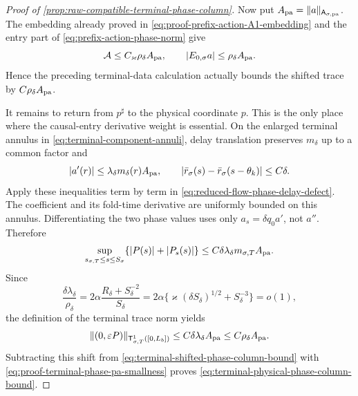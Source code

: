 \begin{proof}[Proof of
\cref{prop:raw-compatible-terminal-phase-column}]
Now put
\(A_{\rm pa}=\|a\|_{\mathsf A_{\sigma,\mathrm{pa}}}\).
The embedding already proved in
\cref{eq:proof-prefix-action-A1-embedding} and the entry part of
\cref{eq:prefix-action-phase-norm} give
\begin{equation}
 \mathcal A\le C_\varkappa\rho_\delta A_{\rm pa},
 \qquad |E_{0,\sigma}a|\le\rho_\delta A_{\rm pa}.  \label{eq:proof-terminal-phase-pa-smallness}
\end{equation}
Hence the preceding terminal-data calculation actually bounds the shifted
trace by \(C\rho_\delta A_{\rm pa}\).

It remains to return from \(p^\sharp\) to the physical coordinate \(p\).
This is the only place where the causal-entry derivative weight is
essential.  On the enlarged terminal annulus in
\cref{eq:terminal-component-annuli}, delay translation preserves
\(m_\delta\) up to a common factor and
\begin{equation}
 |a'(r)|\le\lambda_\delta m_\delta(r)A_{\rm pa},\qquad
 |\bar r_\sigma(s)-\bar r_\sigma(s-\theta_k)|\le C\delta.  \label{eq:proof-terminal-phase-local-difference-input}
\end{equation}
Apply these inequalities term by term in
\cref{eq:reduced-flow-phase-delay-defect}.  The coefficient and its
fold-time derivative are uniformly bounded on this annulus.  Differentiating
the two phase values uses only
\(a_s=\delta q_0a'\), not \(a''\).  Therefore
\begin{equation}
 \sup_{s_{\sigma,T}\le s\le S_\sigma}
   \{|P(s)|+|P_s(s)|\}
 \le C\delta\lambda_\delta m_{\sigma,T}A_{\rm pa}.  \label{eq:proof-terminal-phase-local-difference}
\end{equation}
Since
\begin{equation}
 \frac{\delta\lambda_\delta}{\rho_\delta}
 =2\alpha\frac{R_\delta+S_\delta^{-2}}{S_\delta}
 =2\alpha\{\varkappa(\delta S_\delta)^{1/2}
                  +S_\delta^{-3}\}=o(1),        \label{eq:proof-terminal-phase-shift-ratio}
\end{equation}
the definition of the terminal trace norm yields
\begin{equation}
 \|(0,\varepsilon P)\|_{\mathsf T_{\sigma,T}^1([0,L_b])}
 \le C\delta\lambda_\delta A_{\rm pa}
 \le C\rho_\delta A_{\rm pa}.                  \label{eq:proof-terminal-phase-physical-shift}
\end{equation}
Subtracting this shift from
\cref{eq:terminal-shifted-phase-column-bound} with
\cref{eq:proof-terminal-phase-pa-smallness} proves
\cref{eq:terminal-physical-phase-column-bound}.


\end{proof}
